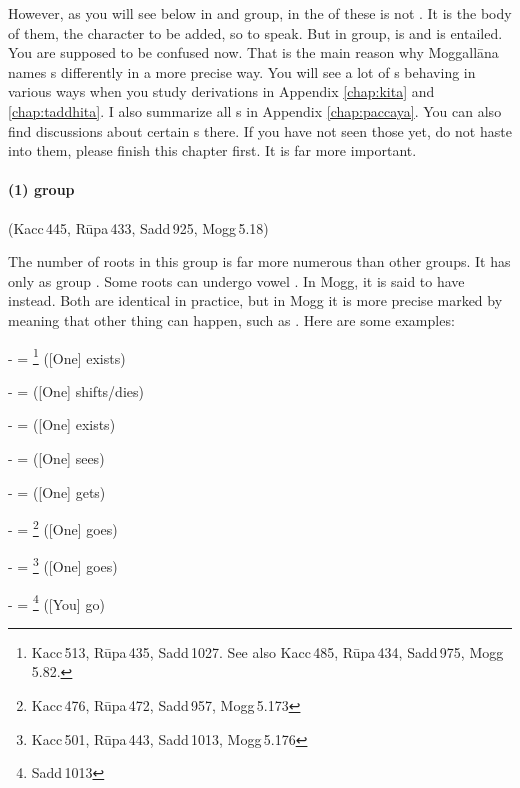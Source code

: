 However, as you will see below in  and  group,  in the  of these is not . It is the body of them, the character to be added, so to speak. But in  group,  is  and  is entailed. You are supposed to be confused now. That is the main reason why Moggall\=ana names s differently in a more precise way. You will see a lot of s behaving in various ways when you study derivations in Appendix \ref{chap:kita} and \ref{chap:taddhita}. I also summarize all s in Appendix \ref{chap:paccaya}. You can also find discussions about certain s there. If you have not seen those yet, do not haste into them, please finish this chapter first. It is far more important.

\paragraph*{(1)  group} (Kacc\,445, R\=upa\,433, Sadd\,925, Mogg\,5.18)\label{pacca:a1}\label{pacca:la1}\par
The number of roots in this group is far more numerous than other groups. It has only  as group . Some roots can undergo vowel . In Mogg, it is said to have  instead. Both are identical in practice, but in Mogg it is more precise marked by  meaning that other thing can happen, such as . Here are some examples:\par
-  = \footnote{Kacc\,513, R\=upa\,435, Sadd\,1027. See also Kacc\,485, R\=upa\,434, Sadd\,975, Mogg\,5.82.} ([One] exists)\par
-  =  ([One] shifts/dies)\par
-  =  ([One] exists)\par
-  =  ([One] sees)\par
-  =  ([One] gets)\par
-  = \footnote{Kacc\,476, R\=upa\,472, Sadd\,957, Mogg\,5.173} ([One] goes)\par
-  = \footnote{Kacc\,501, R\=upa\,443, Sadd\,1013, Mogg\,5.176} ([One] goes)\par
-  = \footnote{Sadd\,1013} ([You] go)\par
